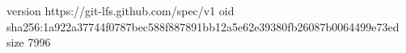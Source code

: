 version https://git-lfs.github.com/spec/v1
oid sha256:1a922a37744f0787bec588f887891bb12a5e62e39380fb26087b0064499e73ed
size 7996
